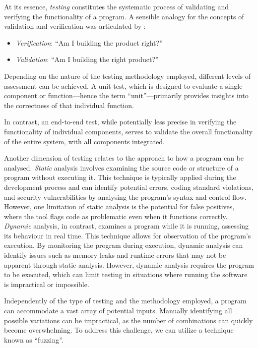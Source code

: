 At its essence, \textit{testing} constitutes the systematic process of validating and verifying the functionality of a program. A sensible analogy for the concepts of validation and verification was articulated by \citet{b_w_boehm_verifying_1984}:

\begin{itemize}[label={}]
    \item \textit{Verification}: “Am I building the product right?” 
    \item \textit{Validation}: “Am I building the right product?”
\end{itemize}



Depending on the nature of the testing methodology employed, different levels of  assessment can be achieved. A unit test, which is designed to evaluate a single component or function—hence the term “unit”—primarily provides insights into the correctness of that individual function. \cite{beck_test-driven_2003}

In contrast, an end-to-end test, while potentially less precise in verifying the functionality of individual components, serves to validate the overall functionality of the entire system, with all components integrated. \cite{paul_end--end_2001}

Another dimension of testing relates to the approach to how a program can be analysed.
\textit{Static} analysis involves examining the source code or structure of a program without executing it. This technique is typically applied during the development process and can identify potential errors, coding standard violations, and security vulnerabilities by analysing the program's syntax and control flow. However, one limitation of static analysis is the potential for false positives, where the tool flags code as problematic even when it functions correctly. 
\textit{Dynamic} analysis, in contrast, examines a program while it is running, assessing its behaviour in real time. This technique allows for observation of the program's execution. By monitoring the program during execution, dynamic analysis can identify issues such as memory leaks and runtime errors that may not be apparent through static analysis. However, dynamic analysis requires the program to be executed, which can limit testing in situations where running the software is impractical or impossible. \cite{hennell_comparison_1990}\cite{umar_comparative_2021} 

Independently of the type of testing and the methodology employed, a program can accommodate a vast array of potential inputs. Manually identifying all possible variations can be impractical, as the number of combinations can quickly become overwhelming. To address this challenge, we can utilize a technique known as “fuzzing”. 


